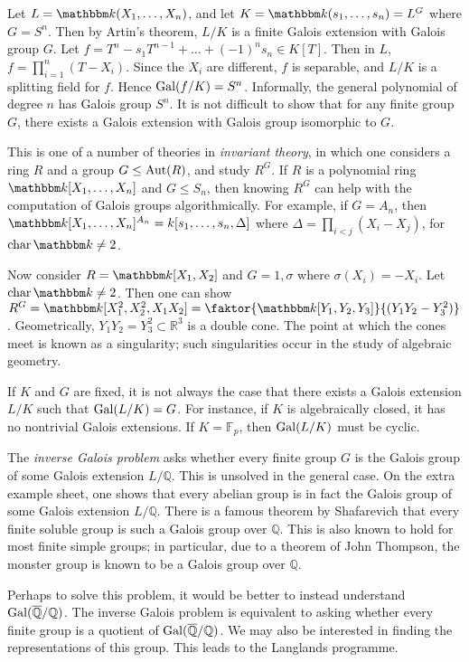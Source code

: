 \begin{example}
	Let \( L = \mathbbm k(X_1, \dots, X_n) \), and let \( K = \mathbbm k(s_1, \dots, s_n) = L^G \) where \( G = S^n \).
	Then by Artin's theorem, \( L/K \) is a finite Galois extension with Galois group \( G \).
	Let \( f = T^n - s_1 T^{n-1} + \dots + (-1)^n s_n \in K[T] \).
	Then in \( L \), \( f = \prod_{i=1}^n (T - X_i) \).
	Since the \( X_i \) are different, \( f \) is separable, and \( L / K \) is a splitting field for \( f \).
	Hence \( \operatorname{Gal}(f/K) = S^n \).
	Informally, the general polynomial of degree \( n \) has Galois group \( S^n \).
	It is not difficult to show that for any finite group \( G \), there exists a Galois extension with Galois group isomorphic to \( G \).

	This is one of a number of theories in \emph{invariant theory}, in which one considers a ring \( R \) and a group \( G \leq \operatorname{Aut}(R) \), and study \( R^G \).
	If \( R \) is a polynomial ring \( \mathbbm k[X_1, \dots, X_n] \) and \( G \leq S_n \), then knowing \( R^G \) can help with the computation of Galois groups algorithmically.
	For example, if \( G = A_n \), then \( \mathbbm k[X_1, \dots, X_n]^{A_n} = k[s_1, \dots, s_n, \Delta] \) where \( \Delta = \prod_{i < j} (X_i - X_j) \), for \( \fchar \mathbbm k \neq 2 \).

	Now consider \( R = \mathbbm k[X_1, X_2] \) and \( G = {1, \sigma} \) where \( \sigma(X_i) = -X_i \).
	Let \( \fchar \mathbbm k \neq 2 \).
	Then one can show \( R^G = \mathbbm k[X_1^2, X_2^2, X_1 X_2] = \faktor{\mathbbm k[Y_1, Y_2, Y_3]}{(Y_1 Y_2 - Y_3^2)} \).
	Geometrically, \( {Y_1 Y_2 = Y_3^2} \subset \mathbb R^3 \) is a double cone.
	The point at which the cones meet is known as a singularity; such singularities occur in the study of algebraic geometry.

	If \( K \) and \( G \) are fixed, it is not always the case that there exists a Galois extension \( L / K \) such that \( \operatorname{Gal}(L/K) = G \).
	For instance, if \( K \) is algebraically closed, it has no nontrivial Galois extensions.
	If \( K = \mathbb F_p \), then \( \operatorname{Gal}(L/K) \) must be cyclic.

	The \emph{inverse Galois problem} asks whether every finite group \( G \) is the Galois group of some Galois extension \( L / \mathbb Q \).
	This is unsolved in the general case.
	On the extra example sheet, one shows that every abelian group is in fact the Galois group of some Galois extension \( L / \mathbb Q \).
	There is a famous theorem by Shafarevich that every finite soluble group is such a Galois group over \( \mathbb Q \).
	This is also known to hold for most finite simple groups; in particular, due to a theorem of John Thompson, the monster group is known to be a Galois group over \( \mathbb Q \).

	Perhaps to solve this problem, it would be better to instead understand \( \operatorname{Gal}(\overline{\mathbb Q}/\mathbb Q) \).
	The inverse Galois problem is equivalent to asking whether every finite group is a quotient of \( \operatorname{Gal}(\overline{\mathbb Q}/\mathbb Q) \).
	We may also be interested in finding the representations of this group.
	This leads to the Langlands programme.
\end{example}
